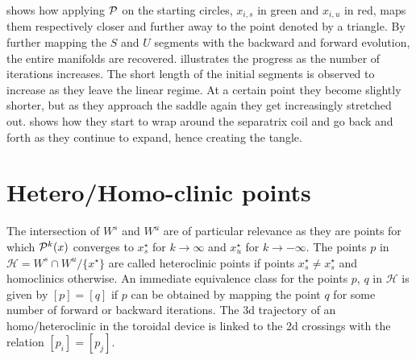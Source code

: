  shows how applying $\mathcal{P}$ on the starting circles, $x_{i,s}$ in green and $x_{i,u}$ in red, maps them respectively closer and further away to the point denoted by a triangle. By further mapping the $S$ and $U$ segments with the backward and forward evolution, the entire manifolds are recovered.  illustrates the progress as the number of iterations increases. The short length of the initial segments is observed to increase as they leave the linear regime. At a certain point they become slightly shorter, but as they approach the saddle again they get increasingly stretched out.  shows how they start to wrap around the separatrix coil and go back and forth as they continue to expand, hence creating the tangle.

\section{Hetero/Homo-clinic points}

The intersection of $W^s$ and $W^u$ are of particular relevance as they are points for which $\mathcal{P}^k(x)$ converges to $x_s^\star$ for $k \to \infty$ and $x_u^\star$ for $k \to -\infty$. The points $p$ in $\mathcal{H} = W^s \cap W^u / \{x^\star\}$ are called heteroclinic points if points $x_s^\star \neq x_s^\star$ and homoclinics otherwise. An immediate equivalence class for the points $p$, $q$ in $\mathcal{H}$ is given by $[p] = [q]$ if $p$ can be obtained by mapping the point $q$ for some number of forward or backward iterations. The 3d trajectory of an homo/heteroclinic in the toroidal device is linked to the 2d crossings with the relation $[p_i] = [p_j]$.

